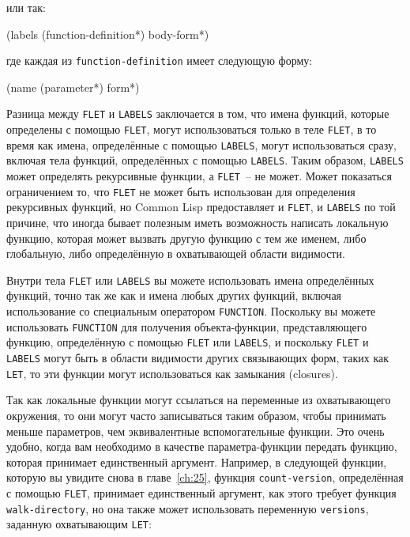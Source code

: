 \noindent{}или так:

\begin{myverb}
(labels (function-definition*)
  body-form*)
\end{myverb}

\noindent{}где каждая из \lstinline{function-definition} имеет следующую форму:

\begin{myverb}
(name (parameter*) form*)
\end{myverb}

Разница между \lstinline{FLET} и \lstinline{LABELS} заключается в том, что имена функций, которые
определены с помощью \lstinline{FLET}, могут использоваться только в теле \lstinline{FLET}, в то
время как имена, определённые с помощью \lstinline{LABELS}, могут использоваться сразу, включая
тела функций, определённых с помощью \lstinline{LABELS}. Таким образом, \lstinline{LABELS} может
определять рекурсивные функции, а \lstinline{FLET}~-- не может.  Может показаться ограничением
то, что \lstinline{FLET} не может быть использован для определения рекурсивных функций, но
Common Lisp предоставляет и \lstinline{FLET}, и \lstinline{LABELS} по той причине, что иногда бывает
полезным иметь возможность написать локальную функцию, которая может вызвать другую функцию
с тем же именем, либо глобальную, либо определённую в охватывающей области видимости.

Внутри тела \lstinline{FLET} или \lstinline{LABELS} вы можете использовать имена определённых
функций, точно так же как и имена любых других функций, включая использование со
специальным оператором \lstinline{FUNCTION}.  Поскольку вы можете использовать \lstinline{FUNCTION}
для получения объекта-функции, представляющего функцию, определённую с помощью \lstinline{FLET}
или \lstinline{LABELS}, и поскольку \lstinline{FLET} и \lstinline{LABELS} могут быть в области видимости
других связывающих форм, таких как \lstinline{LET}, то эти функции могут использоваться как
замыкания (closures).

Так как локальные функции могут ссылаться на переменные из охватывающего окружения, то
они могут часто записываться таким образом, чтобы принимать меньше параметров, чем
эквивалентные вспомогательные функции.  Это очень удобно, когда вам необходимо в качестве
параметра-функции передать функцию, которая принимает единственный аргумент. Например, в
следующей функции, которую вы увидите снова в главе~\ref{ch:25}, функция
\lstinline{count-version}, определённая с помощью \lstinline{FLET}, принимает единственный аргумент,
как этого требует функция \lstinline{walk-directory}, но она также может использовать
переменную \lstinline{versions}, заданную охватывающим \lstinline{LET}:

